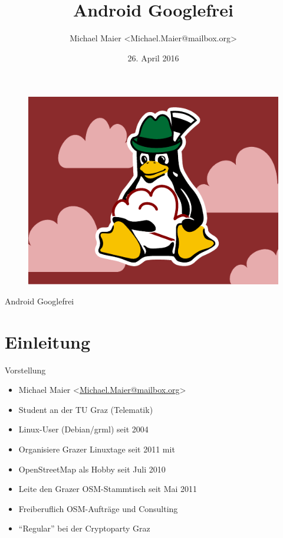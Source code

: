 \documentclass{beamer}
\title{Android Googlefrei}
\author{Michael Maier \textless Michael.Maier@mailbox.org\textgreater}
\date{26. April 2016}
\begin{document}

\begin{frame} 


\begin{figure}
  \centering
  \includegraphics[width=.8\textwidth]{titel.pdf}
\end{figure}

\begin{center}
\Huge{Android Googlefrei\\}
\end{center}


\end{frame}


\section{Einleitung}


\begin{frame}{Vorstellung}

  \begin{itemize}
    \item Michael Maier \textless \href{mailto:Michael.Maier@mailbox.org}{Michael.Maier@mailbox.org}\textgreater
    \item Student an der TU Graz (Telematik)
\vspace{0.3cm}
    \item Linux-User (Debian/grml) seit 2004
    \item Organisiere Grazer Linuxtage seit 2011 mit
    \item OpenStreetMap als Hobby seit Juli 2010
    \item Leite den Grazer OSM-Stammtisch seit Mai 2011
\vspace{0.3cm}
    \item Freiberuflich OSM-Aufträge und Consulting
    \item "`Regular"' bei der Cryptoparty Graz
  \end{itemize}
\end{frame}
\end{document}
